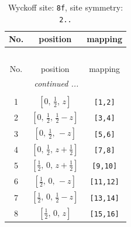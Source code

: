 \documentclass[fleqn,8pt]{jsarticle}
\begin{document}
\begin{longtable}{ccc}
\caption{Wyckoff site: {\tt 8f}, site symmetry: {\tt 2..}}
 \\
 \hline \hline
No. & position & mapping \\ \hline \endfirsthead

\multicolumn{2}{l}{\tablename\ \thetable{}} \\
 \hline \hline
No. & position & mapping \\ \hline \endhead

 \hline \hline
\multicolumn{2}{r}{\footnotesize\it continued ...} \\ \endfoot

 \hline \hline
\multicolumn{2}{r}{} \\ \endlastfoot

1 & $\left[ 0,\, \frac{1}{2},\, z \right]$ & {\tt [1,2]} \\ \hline
2 & $\left[ 0,\, \frac{1}{2},\, \frac{1}{2} - z \right]$ & {\tt [3,4]} \\ \hline
3 & $\left[ 0,\, \frac{1}{2},\, - z \right]$ & {\tt [5,6]} \\ \hline
4 & $\left[ 0,\, \frac{1}{2},\, z + \frac{1}{2} \right]$ & {\tt [7,8]} \\ \hline
5 & $\left[ \frac{1}{2},\, 0,\, z + \frac{1}{2} \right]$ & {\tt [9,10]} \\ \hline
6 & $\left[ \frac{1}{2},\, 0,\, - z \right]$ & {\tt [11,12]} \\ \hline
7 & $\left[ \frac{1}{2},\, 0,\, \frac{1}{2} - z \right]$ & {\tt [13,14]} \\ \hline
8 & $\left[ \frac{1}{2},\, 0,\, z \right]$ & {\tt [15,16]} \\
\end{longtable}
\renewcommand{\arraystretch}{1.2}
\end{document}

